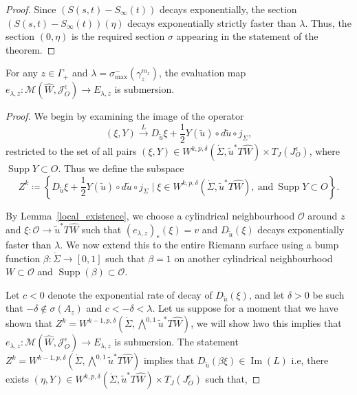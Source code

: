 \documentclass[11pt, a4paper]{amsart}
\newcommand{\cJ}{\mathcal{J}}
\newcommand{\cM}{\mathcal{M}}
\newcommand{\cO}{\mathcal{O}}
\DeclareMathOperator{\im}{Im}
\DeclareMathOperator{\supp}{Supp}
\begin{document}
\begin{proof}
Since $\left(S(s,t)-S_{\infty}(t)\right)$ decays exponentially, the section $\left(S(s,t)-S_{\infty}(t)\right)(\eta)$ decays exponentially strictly faster than $\lambda$. Thus, the section $(0,\eta)$ is the required section $\sigma$ appearing in the statement of the theorem.
\end{proof}


\begin{proposition}   
\label{regularity of evaluation map}
For any $z\in \Gamma_+$ and $\lambda = \sigma_{\max}^-(\gamma_z^{m_z})$, the evaluation map $e_{\lambda,z}\colon \cM(\widehat{W},\cJ^{\epsilon}_O) \rightarrow E_{\lambda,z}$ is submersion.
\end{proposition}


\begin{proof}

We begin by examining the image of the operator
$$(\xi,Y)\xrightarrow[]{L}D_{\tilde{u}}\xi+\frac{1}{2}Y(\tilde{u})\circ d\tilde{u}\circ j_{\Sigma},$$
restricted to the set of all pairs $(\xi,Y) \in W^{k,p,\delta}\left(\dot{\Sigma}, \tilde{u}^*T\widehat{W}\right)\times  T_J(J^{\epsilon}_O)$, where $\supp{Y}\subset O$. Thus we define the subspace
$$Z^k \coloneqq \left\{ D_{\tilde{u}}\xi+\frac{1}{2}Y(\tilde{u})\circ d\tilde{u}\circ j_{\Sigma} \mid \xi \in W^{k,p,\delta}\left(\dot{\Sigma}, \tilde{u}^*T\widehat{W}\right),\mathrm{\ and \ }\supp Y \subset O \right\}.$$

By Lemma~\ref{local_existence}, we choose a cylindrical neighbourhood $\cO$ around $z$ and  $\xi: \cO \rightarrow \tilde{u}^*T\widehat{W}$ such that  $(e_{\lambda,z})_*(\xi)=v$ and $D_{\tilde{u}}(\xi)$ decays exponentially faster than $\lambda$. We now extend this to the entire Riemann surface using a bump function $\beta:\dot{\Sigma} \rightarrow [0,1]$ such that $\beta=1$ on another cylindrical neighbourhood $W\subset \cO$ and $\supp (\beta) \subset \cO$.


Let $c<0$ denote the exponential rate of decay of $D_{\tilde{u}}(\xi)$, and let $\delta>0$ be such that $-\delta \not\in \sigma(A_z)$ and $c<-\delta<\lambda$. Let us suppose for a moment that we have shown that $Z^k = W^{k-1,p,\delta}\left(\dot{\Sigma}, \bigwedge\nolimits^{0,1}\tilde{u}^*T\widehat{W}\right)$, we will show hwo this implies that 
$e_{\lambda,z}\colon \cM(\widehat{W},\cJ^{\epsilon}_O) \rightarrow E_{\lambda,z}$ is submersion. 
The statement $Z^k = W^{k-1,p,\delta}\left(\dot{\Sigma}, \bigwedge\nolimits^{0,1}\tilde{u}^*T\widehat{W}\right)$ implies that $D_{\tilde{u}}(\beta \xi) \in \im(L)$ i.e, there exists $(\eta,Y) \in W^{k,p,\delta}\left(\dot{\Sigma}, \tilde{u}^*T\widehat{W}\right)\times  T_J(J^{\epsilon}_O)$ such that,


\end{proof}
\end{document}
